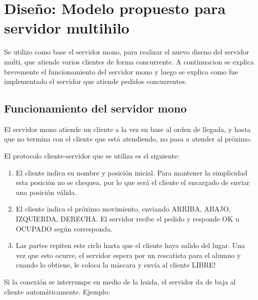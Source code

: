 \section{Dise\~no: Modelo propuesto para servidor multihilo}

Se utilizo como base el servidor mono, para realizar el nuevo diseno del servidor multi, que atiende varios clientes de forma concurrente. A continuacion se explica brevemente el funcionamiento del servidor mono y luego se explica como fue implementado el servidor que atiende pedidos concurrentes.

\subsection{Funcionamiento del servidor mono}
El servidor mono atiende un cliente a la vez en base al orden de llegada, y hasta que no termina con el cliente que est\'a atendiendo, no pasa a atender al pr\'oximo.

El protocolo cliente-servidor que se utiliza es el siguiente:
\begin{enumerate}
\item El cliente indica su nombre y posici\'on inicial. Para mantener la simplicidad esta posici\'on no se chequea, por lo que ser\'a el cliente el encargado de enviar una posici\'on v\'alida.
\item El cliente indica el pr\'oximo movimiento, enviando ARRIBA, ABAJO, IZQUIERDA, DERECHA. El servidor recibe el pedido y responde OK u OCUPADO seg\'un corresponda.
\item Las partes repiten este ciclo hasta que el cliente haya salido del lugar. Una vez que esto ocurre, el servidor espera por un rescatista para el alumno y cuando lo obtiene, le coloca la m\'ascara y env\'ia al cliente LIBRE!
\end{enumerate}

Si la conexi\'on se interrumpe en medio de la huida, el servidor da de baja al cliente autom\'aticamente.
Ejemplo:

